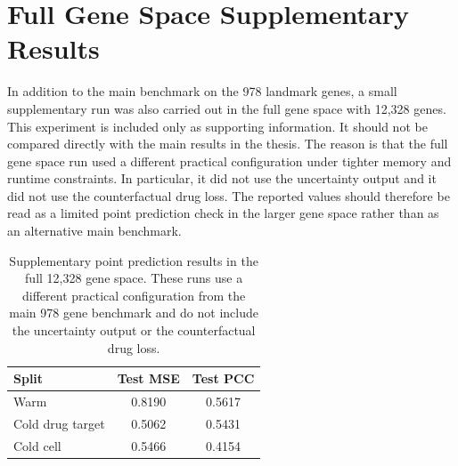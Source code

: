 \chapter{Full Gene Space Supplementary Results}
\label{app:full_gene_space_results}

\noindent In addition to the main benchmark on the 978 landmark genes, a small supplementary run was also carried out in the full gene space with 12,328 genes. This experiment is included only as supporting information. It should not be compared directly with the main results in the thesis. The reason is that the full gene space run used a different practical configuration under tighter memory and runtime constraints. In particular, it did not use the uncertainty output and it did not use the counterfactual drug loss. The reported values should therefore be read as a limited point prediction check in the larger gene space rather than as an alternative main benchmark.

\begin{table}[htbp]
    \centering
    \caption[Supplementary Results in the 12,328 Gene Space]{Supplementary point prediction results in the full 12,328 gene space. These runs use a different practical configuration from the main 978 gene benchmark and do not include the uncertainty output or the counterfactual drug loss.}
    \label{tab:full_gene_space_results}
    \begin{tabular}{lcc}
        \hline
        Split & Test MSE & Test PCC \\
        \hline
        Warm & 0.8190 & 0.5617 \\
        Cold drug target & 0.5062 & 0.5431 \\
        Cold cell & 0.5466 & 0.4154 \\
        \hline
    \end{tabular}
\end{table}
